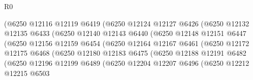 \begin{lexlean}{R0}
\begin{coremodule}
                              (@6250
                                @12116
                                @12119
                                @6419
                                (@6250
                                  @12124
                                  @12127
                                  @6426
                                  (@6250
                                    @12132
                                    @12135
                                    @6433
                                    (@6250
                                      @12140
                                      @12143
                                      @6440
                                      (@6250
                                        @12148
                                        @12151
                                        @6447
                                        (@6250
                                          @12156
                                          @12159
                                          @6454
                                          (@6250
                                            @12164
                                            @12167
                                            @6461
                                            (@6250
                                              @12172
                                              @12175
                                              @6468
                                              (@6250
                                                @12180
                                                @12183
                                                @6475
                                                (@6250
                                                  @12188
                                                  @12191
                                                  @6482
                                                  (@6250
                                                    @12196
                                                    @12199
                                                    @6489
                                                    (@6250
                                                      @12204
                                                      @12207
                                                      @6496
                                                      (@6250
                                                        @12212
                                                        @12215
                                                        @6503

\end{coremodule}
\end{lexlean}
